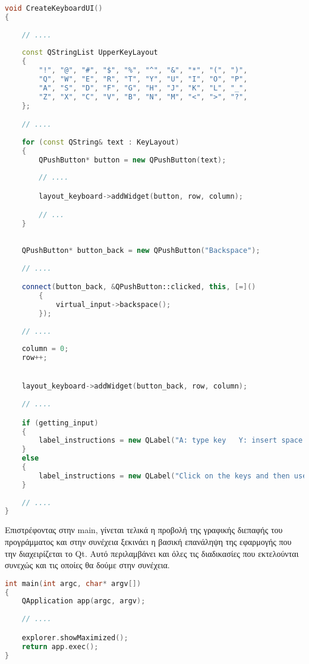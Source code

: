 \begin{lstlisting}[language=C++, style=cppstyle]
void CreateKeyboardUI()
{
    
    // ....
    
    const QStringList UpperKeyLayout
    {
        "!", "@", "#", "$", "%", "^", "&", "*", "(", ")",
        "Q", "W", "E", "R", "T", "Y", "U", "I", "O", "P",
        "A", "S", "D", "F", "G", "H", "J", "K", "L", "_",
        "Z", "X", "C", "V", "B", "N", "M", "<", ">", "?",
    };

    // ....
    
    for (const QString& text : KeyLayout)
    {
        QPushButton* button = new QPushButton(text);
        
        // ....

        layout_keyboard->addWidget(button, row, column);

        // ...
    }
    
    
    QPushButton* button_back = new QPushButton("Backspace");
    
    // ....

    connect(button_back, &QPushButton::clicked, this, [=]()
        {
            virtual_input->backspace();
        });
    
    // ....
    
    column = 0;
    row++;


    layout_keyboard->addWidget(button_back, row, column);
    
    // ....

    if (getting_input)
    {
        label_instructions = new QLabel("A: type key   Y: insert space   X: Backspace   Start: send input", this);
    }
    else
    {
        label_instructions = new QLabel("Click on the keys and then use the copy button to save input to clipboard", this);
    }
    
    // ....
}
\end{lstlisting}

Επιστρέφοντας στην main, γίνεται τελικά η προβολή της γραφικής διεπαφής του προγράμματος και στην συνέχεια
ξεκινάει η βασική επανάληψη της εφαρμογής που την διαχειρίζεται το Qt. Αυτό περιλαμβάνει και όλες τις διαδικασίες
που εκτελούνται συνεχώς και τις οποίες θα δούμε στην συνέχεια.

\begin{lstlisting}[language=C++, style=cppstyle]
int main(int argc, char* argv[]) 
{
    QApplication app(argc, argv);
    
    // ....

    explorer.showMaximized();
    return app.exec();
}
\end{lstlisting}


